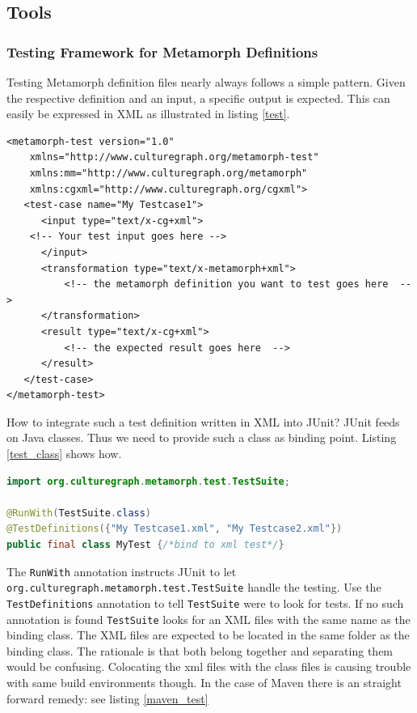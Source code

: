 \documentclass[12pt,a4paper]{article}
\begin{document}
\subsection{Tools}

\subsubsection{Testing Framework for Metamorph Definitions}

Testing Metamorph definition files nearly always follows a simple pattern. Given the respective definition and an input, a specific output is expected. This can easily be expressed in XML as illustrated in listing \ref{test}.

\begin{lstlisting}[float=htb, label=test,caption=XML test definition]
<metamorph-test version="1.0"
	xmlns="http://www.culturegraph.org/metamorph-test" 
	xmlns:mm="http://www.culturegraph.org/metamorph"
	xmlns:cgxml="http://www.culturegraph.org/cgxml">
   <test-case name="My Testcase1">
      <input type="text/x-cg+xml">
	<!-- Your test input goes here -->           
      </input>
      <transformation type="text/x-metamorph+xml">
          <!-- the metamorph definition you want to test goes here  -->   
      </transformation>
      <result type="text/x-cg+xml">
          <!-- the expected result goes here  -->  
      </result>
   </test-case>
</metamorph-test>
\end{lstlisting}

How to integrate such a test definition written in XML into JUnit? JUnit feeds on Java classes. Thus we need to provide such a class as binding point. Listing  \ref{test_class} shows how.

\begin{lstlisting}[float=htb, label=test_class,caption= Binding XML test definitions to a test class., language=Java]
import org.culturegraph.metamorph.test.TestSuite;

@RunWith(TestSuite.class)
@TestDefinitions({"My Testcase1.xml", "My Testcase2.xml"})
public final class MyTest {/*bind to xml test*/}
\end{lstlisting}

The {\tt RunWith} annotation instructs JUnit to let {\tt org.culturegraph.metamorph.test.TestSuite} handle the testing.
Use the {\tt TestDefinitions} annotation to tell {\tt TestSuite} were to look for tests. If no such annotation is found {\tt TestSuite} looks for an XML files with the same name as the binding class. The XML files are expected to be located in the same folder as the binding class. The rationale is that both belong together and separating them would be confusing. Colocating the xml files with the class files is causing trouble with same build environments though. In the case of Maven there is an straight forward remedy: see listing \ref{maven_test}
\end{document}

